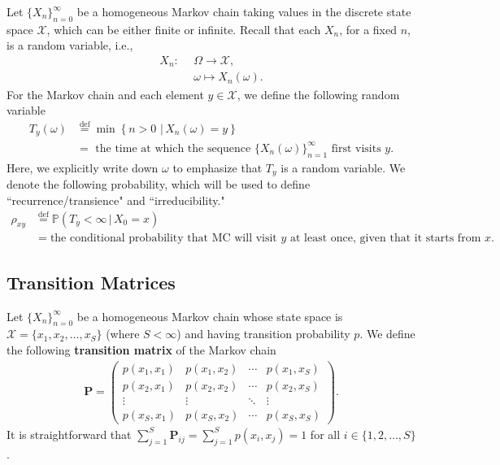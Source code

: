 \documentclass[11pt,letterpaper, leqno]{article}
\numberwithin{equation}{section}
\numberwithin{theorem}{section}
\numberwithin{lemma}{section}
\numberwithin{corollary}{section}
\numberwithin{definition}{section}
\numberwithin{proposition}{section}
\numberwithin{remark}{section}
\numberwithin{example}{section}
\begin{document}
Let $\{X_n\}_{n=0}^\infty$ be a homogeneous Markov chain taking values in the discrete state space $\mathcal{X}$, which can be either finite or infinite. Recall that each $X_n$, for a fixed $n$, is a random variable, i.e., 
\begin{align*}
    X_n: \ \  & \Omega \rightarrow\mathcal{X}, \\
    & \omega \mapsto X_n(\omega).
\end{align*}
For the Markov chain and each element $y\in\mathcal{X}$, we define the following random variable
\begin{align*}
    T_y(\omega) &\overset{\operatorname{def}}{=}\min\left\{ n>0\, \,\vert\, X_n(\omega)=y\right\} \\
    &= \mbox{ the time at which the sequence $\{X_n(\omega)\}_{n=1}^\infty$ first visits }y.
\end{align*}
Here, we explicitly write down $\omega$ to emphasize that $T_y$ is a random variable. We denote the following probability, which will be used to define ``recurrence/transience" and ``irreducibility."
\begin{align*}
    \rho_{xy}&\overset{\operatorname{def}}{=}\mathbb{P}(T_y<\infty \,\vert \, X_0=x) \\
    & = \mbox{the conditional probability that MC will visit $y$ at least once, given that it starts from $x$.}
\end{align*}


\subsection{Transition Matrices}

Let $\{X_n\}_{n=0}^\infty$ be a homogeneous Markov chain whose state space is $\mathcal{X}=\{x_1,x_2,\ldots, x_S\}$ (where $S<\infty$) and having transition probability $p$. We define the following \textbf{transition matrix} of the Markov chain
\begin{align}\label{eq: transition matrix}
    \boldsymbol{P}=
    \begin{pmatrix}
    p(x_1, x_1) & p(x_1, x_2) & \cdots & p(x_1, x_S) \\
    p(x_2, x_1) & p(x_2, x_2) & \cdots & p(x_2, x_S) \\
    \vdots & \vdots & \ddots & \vdots \\
    p(x_S, x_1) & p(x_S, x_2) & \cdots & p(x_S, x_S)
    \end{pmatrix}.
\end{align}
It is straightforward that $\sum_{j=1}^S \boldsymbol{P}_{ij}=\sum_{j=1}^S p(x_i, x_j)=1$ for all $i\in\{1,2,\ldots,S\}$.
\end{document}
